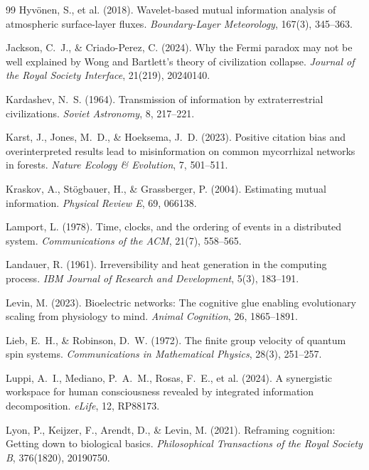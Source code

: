 \documentclass[11pt,twocolumn]{article}
\begin{document}
\begin{thebibliography}{99}
 Hyvönen, S., et al. (2018). Wavelet-based mutual information analysis of atmospheric surface-layer fluxes. \emph{Boundary-Layer Meteorology}, 167(3), 345--363.

 Jackson, C.~J., \& Criado-Perez, C. (2024). Why the Fermi paradox may not be well explained by Wong and Bartlett's theory of civilization collapse. \emph{Journal of the Royal Society Interface}, 21(219), 20240140.

 Kardashev, N.~S. (1964). Transmission of information by extraterrestrial civilizations. \emph{Soviet Astronomy}, 8, 217--221.

 Karst, J., Jones, M.~D., \& Hoeksema, J.~D. (2023). Positive citation bias and overinterpreted results lead to misinformation on common mycorrhizal networks in forests. \emph{Nature Ecology \& Evolution}, 7, 501--511.

 Kraskov, A., Stögbauer, H., \& Grassberger, P. (2004). Estimating mutual information. \emph{Physical Review E}, 69, 066138.

 Lamport, L. (1978). Time, clocks, and the ordering of events in a distributed system. \emph{Communications of the ACM}, 21(7), 558--565.

 Landauer, R. (1961). Irreversibility and heat generation in the computing process. \emph{IBM Journal of Research and Development}, 5(3), 183--191.

 Levin, M. (2023). Bioelectric networks: The cognitive glue enabling evolutionary scaling from physiology to mind. \emph{Animal Cognition}, 26, 1865--1891.

 Lieb, E.~H., \& Robinson, D.~W. (1972). The finite group velocity of quantum spin systems. \emph{Communications in Mathematical Physics}, 28(3), 251--257.

 Luppi, A.~I., Mediano, P.~A.~M., Rosas, F.~E., et al. (2024). A synergistic workspace for human consciousness revealed by integrated information decomposition. \emph{eLife}, 12, RP88173.

 Lyon, P., Keijzer, F., Arendt, D., \& Levin, M. (2021). Reframing cognition: Getting down to biological basics. \emph{Philosophical Transactions of the Royal Society B}, 376(1820), 20190750.


\end{thebibliography}
\end{document}
